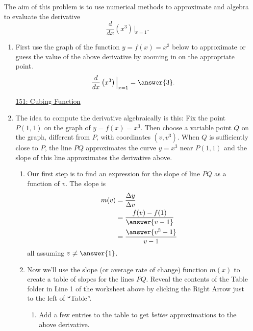 \documentclass{ximera}
\begin{document}
\begin{exploration}   \label{Exp9039000030}
The aim of this problem is to use numerical methods to approximate and algebra to evaluate the derivative
\[
   \frac{d}{dx}\left( x^3 \right) \Big|_{x=1}.
\]

\begin{enumerate}

\item First use the graph of the function $y=f(x)=x^3$ below to approximate or guess the value of the above derivative by zooming in on the appropriate point.
\[
      \frac{d}{dx}\left( x^3 \right)\Big|_{x=1} = \answer{3} .
\]


\begin{onlineOnly}
    \begin{center}
\end{center}
\end{onlineOnly}

\href{https://www.desmos.com/calculator/rto22qzlvm}{151: Cubing Function}

\item The idea to compute the derivative algebraically is this: Fix the point $P(1,1)$ on the graph of $y=f(x)=x^3$. Then choose a variable point $Q$ on the graph, different from $P$, with coordinates $(v,v^3)$. When $Q$ is sufficiently close to $P$, the line $PQ$ approximates the curve $y=x^3$ near $P(1,1)$ and the slope of this line approximates the derivative above. 

\begin{enumerate}
\item Our first step is to find an expression for the slope of line $PQ$ as a function of $v$. The slope is
\begin{align*}
        m(v) &= \frac{\Delta y}{\Delta v}  \\
                & = \frac{f(v) - f(1)}{\answer{v-1}} \\
                & = \frac{\answer{v^3-1}}{v-1} \\
\end{align*}
all assuming $v\neq \answer{1}$.

\item Now we'll use the slope (or average rate of change) function $m(x)$ to create a table of slopes for the lines $PQ$. Reveal the contents of the Table folder in Line 1 of the worksheet above by clicking the Right Arrow just to the left of ``Table''. 

\begin{enumerate}
\item Add a few entries to the table to get \emph{better} approximations to the above derivative. 


\end{enumerate}
\end{enumerate}
\end{enumerate}
\end{exploration}
\end{document}
